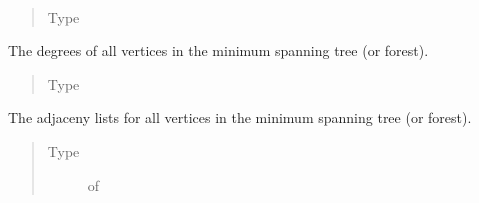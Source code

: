 \documentclass[letterpaper,10pt,english]{sphinxmanual}
\begin{document}
\begin{fulllineitems}
\begin{fulllineitems}
\end{fulllineitems}


\begin{fulllineitems}
\label{\detokenize{documentation:tmap.GraphProperties.n_isolated_vertices}}~\begin{quote}\begin{description}
\item[{Type}] \leavevmode
{}

\end{description}\end{quote}

\end{fulllineitems}


\begin{fulllineitems}
\label{\detokenize{documentation:tmap.GraphProperties.degrees}}
The degrees of all vertices in the minimum spanning tree (or forest).
\begin{quote}\begin{description}
\item[{Type}] \leavevmode
{}

\end{description}\end{quote}

\end{fulllineitems}


\begin{fulllineitems}
\label{\detokenize{documentation:tmap.GraphProperties.adjacency_list}}
The adjaceny lists for all vertices in the minimum spanning tree (or forest).
\begin{quote}\begin{description}
\item[{Type}] \leavevmode
{} of 


\end{description}
\end{quote}
\end{fulllineitems}
\end{fulllineitems}
\end{document}
